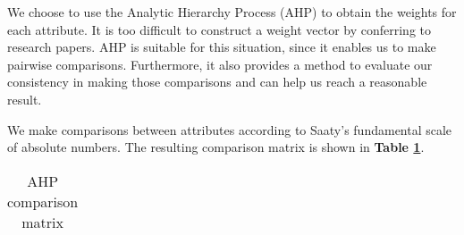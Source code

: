 \documentclass[12pt]{article}
\begin{document}
		We choose to use the Analytic Hierarchy Process (AHP) to obtain the weights for each attribute.  It is too difficult to construct a weight vector by conferring to research papers.  AHP is suitable for this situation, since it enables us to make pairwise comparisons.  Furthermore, it also provides a method to evaluate our consistency in making those comparisons and can help us reach a reasonable result.
		
		We make comparisons between attributes according to Saaty's fundamental scale of absolute numbers\autocite{AHP}.  The resulting comparison matrix is shown in \textbf{Table \ref{tb:mat}}.
		
		{
			\fontsize{10}{18}\selectfont
			{
				\begin{longtable}{c|ccccccccc|ccccc||cccc}
					
					\caption{AHP comparison matrix}
					\label{tb:mat}\\
					

\end{longtable}}}
\end{document}
